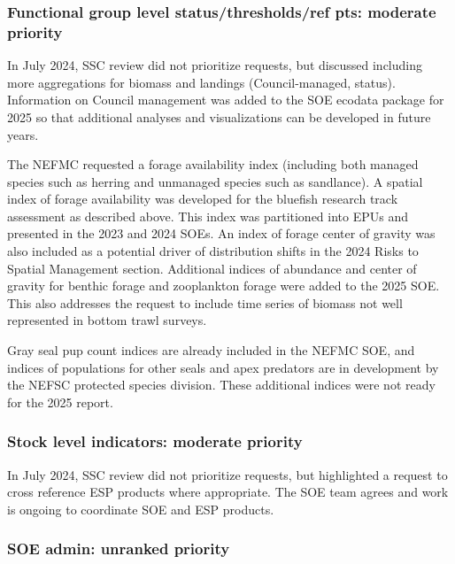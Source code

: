 \documentclass[
  10pt,
]{article}
\begin{document}
\subsubsection{Functional group level status/thresholds/ref pts:
moderate
priority}\label{functional-group-level-statusthresholdsref-pts-moderate-priority}

In July 2024, SSC review did not prioritize requests, but discussed
including more aggregations for biomass and landings (Council-managed,
status). Information on Council management was added to the SOE ecodata
package for 2025 so that additional analyses and visualizations can be
developed in future years.

The NEFMC requested a forage availability index (including both managed
species such as herring and unmanaged species such as sandlance). A
spatial index of forage availability was developed for the bluefish
research track assessment as described above. This index was partitioned
into EPUs and presented in the 2023 and 2024 SOEs. An index of forage
center of gravity was also included as a potential driver of
distribution shifts in the 2024 Risks to Spatial Management section.
Additional indices of abundance and center of gravity for benthic forage
and zooplankton forage were added to the 2025 SOE. This also addresses
the request to include time series of biomass not well represented in
bottom trawl surveys.

Gray seal pup count indices are already included in the NEFMC SOE, and
indices of populations for other seals and apex predators are in
development by the NEFSC protected species division. These additional
indices were not ready for the 2025 report.

\subsubsection{Stock level indicators: moderate
priority}\label{stock-level-indicators-moderate-priority}

In July 2024, SSC review did not prioritize requests, but highlighted a
request to cross reference ESP products where appropriate. The SOE team
agrees and work is ongoing to coordinate SOE and ESP products.

\subsubsection{SOE admin: unranked
priority}\label{soe-admin-unranked-priority}
\end{document}

